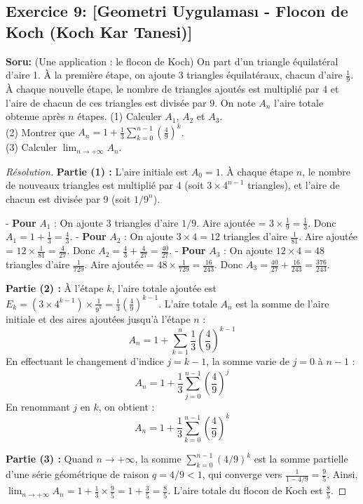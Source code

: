 \documentclass[12pt,a4paper]{report}
\begin{document}
\subsection*{Exercice 9: [Geometri Uygulaması - Flocon de Koch (Koch Kar Tanesi)]}

\textbf{Soru:}
(Une application : le flocon de Koch) On part d'un triangle équilatéral d'aire 1. À la première étape, on ajoute 3 triangles équilatéraux, chacun d'aire $\frac{1}{9}$. À chaque nouvelle étape, le nombre de triangles ajoutés est multiplié par 4 et l'aire de chacun de ces triangles est divisée par 9. On note $A_n$ l'aire totale obtenue après $n$ étapes.
(1) Calculer $A_1$, $A_2$ et $A_3$.\\
(2) Montrer que $A_n = 1 + \frac{1}{3} \sum_{k=0}^{n-1} \left(\frac{4}{9}\right)^k$.\\
(3) Calculer $\lim_{n \to +\infty} A_n$.

\begin{proof}[Résolution]
\textbf{Partie (1) :}
L'aire initiale est $A_0 = 1$.
À chaque étape $n$, le nombre de nouveaux triangles est multiplié par 4 (soit $3 \times 4^{n-1}$ triangles), et l'aire de chacun est divisée par 9 (soit $1/9^n$).

- \textbf{Pour } $A_1$ : On ajoute 3 triangles d'aire $1/9$. 
Aire ajoutée = $3 \times \frac{1}{9} = \frac{1}{3}$. Donc $A_1 = 1 + \frac{1}{3} = \frac{4}{3}$.
- \textbf{Pour } $A_2$ : On ajoute $3 \times 4 = 12$ triangles d'aire $\frac{1}{81}$.
Aire ajoutée = $12 \times \frac{1}{81} = \frac{4}{27}$. Donc $A_2 = \frac{4}{3} + \frac{4}{27} = \frac{40}{27}$.
- \textbf{Pour } $A_3$ : On ajoute $12 \times 4 = 48$ triangles d'aire $\frac{1}{729}$.
Aire ajoutée = $48 \times \frac{1}{729} = \frac{16}{243}$. Donc $A_3 = \frac{40}{27} + \frac{16}{243} = \frac{376}{243}$.

\textbf{Partie (2) :}
À l'étape $k$, l'aire totale ajoutée est $E_k = (3 \times 4^{k-1}) \times \frac{1}{9^k} = \frac{1}{3} \left(\frac{4}{9}\right)^{k-1}$.
L'aire totale $A_n$ est la somme de l'aire initiale et des aires ajoutées jusqu'à l'étape $n$ :
\[ A_n = 1 + \sum_{k=1}^n \frac{1}{3} \left(\frac{4}{9}\right)^{k-1} \]
En effectuant le changement d'indice $j = k - 1$, la somme varie de $j=0$ à $n-1$ :
\[ A_n = 1 + \frac{1}{3} \sum_{j=0}^{n-1} \left(\frac{4}{9}\right)^j \]
En renommant $j$ en $k$, on obtient :
\[ A_n = 1 + \frac{1}{3} \sum_{k=0}^{n-1} \left(\frac{4}{9}\right)^k \]

\textbf{Partie (3) :}
Quand $n \to +\infty$, la somme $\sum_{k=0}^{n-1} (4/9)^k$ est la somme partielle d'une série géométrique de raison $q = 4/9 < 1$, qui converge vers $\frac{1}{1 - 4/9} = \frac{9}{5}$.
Ainsi, $\lim_{n \to +\infty} A_n = 1 + \frac{1}{3} \times \frac{9}{5} = 1 + \frac{3}{5} = \frac{8}{5}$.
L'aire totale du flocon de Koch est $\frac{8}{5}$.
\end{proof}
\end{document}
